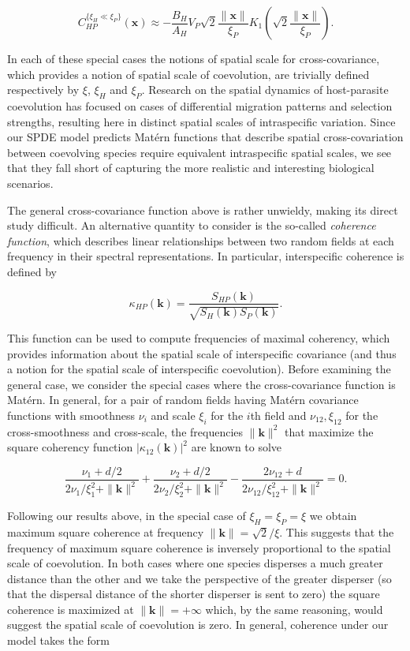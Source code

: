 \documentclass{article}
\begin{document}
\[C_{HP}^{\{\xi_H\ll\xi_P\}}(\pmb x)\approx-\frac{B_H}{A_H}V_P\sqrt2\frac{\|\pmb x\|}{\xi_P}K_1\left(\sqrt2\frac{\|\pmb x\|}{\xi_P}\right).\]

In each of these special cases the notions of spatial scale for
cross-covariance, which provides a notion of spatial scale of
coevolution, are trivially defined respectively by \(\xi\), \(\xi_H\)
and \(\xi_P\). Research on the spatial dynamics of host-parasite
coevolution has focused on cases of differential migration patterns and
selection strengths, resulting here in distinct spatial scales of
intraspecific variation. Since our SPDE model predicts Matérn functions
that describe spatial cross-covariation between coevolving species
require equivalent intraspecific spatial scales, we see that they fall
short of capturing the more realistic and interesting biological
scenarios.

The general cross-covariance function above is rather unwieldy, making
its direct study difficult. An alternative quantity to consider is the
so-called \emph{coherence function}, which describes linear
relationships between two random fields at each frequency in their
spectral representations. In particular, interspecific coherence is
defined by

\[\kappa_{HP}(\pmb k)=\frac{S_{HP}(\pmb k)}{\sqrt{S_H(\pmb k)S_P(\pmb k)}}.\]

This function can be used to compute frequencies of maximal coherency,
which provides information about the spatial scale of interspecific
covariance (and thus a notion for the spatial scale of interspecific
coevolution). Before examining the general case, we consider the special
cases where the cross-covariance function is Matérn. In general, for a
pair of random fields having Matérn covariance functions with smoothness
\(\nu_i\) and scale \(\xi_i\) for the \(i\)th field and
\(\nu_{12},\xi_{12}\) for the cross-smoothness and cross-scale, the
frequencies \(\|\pmb k\|^2\) that maximize the square coherency function
\(|\kappa_{12}(\pmb k)|^2\) are known to solve

\[\frac{\nu_1+d/2}{2\nu_1/\xi_1^2+\|\pmb k\|^2}+\frac{\nu_2+d/2}{2\nu_2/\xi_2^2+\|\pmb k\|^2}-\frac{2\nu_{12}+d}{2\nu_{12}/\xi_{12}^2+\|\pmb k\|^2}=0.\]

Following our results above, in the special case of \(\xi_H=\xi_P=\xi\)
we obtain maximum square coherence at frequency
\(\|\pmb k\|=\sqrt2/\xi\). This suggests that the frequency of maximum
square coherence is inversely proportional to the spatial scale of
coevolution. In both cases where one species disperses a much greater
distance than the other and we take the perspective of the greater
disperser (so that the dispersal distance of the shorter disperser is
sent to zero) the square coherence is maximized at
\(\|\pmb k\|=+\infty\) which, by the same reasoning, would suggest the
spatial scale of coevolution is zero. In general, coherence under our
model takes the form
\end{document}
